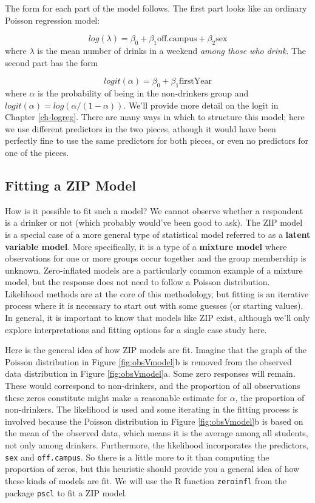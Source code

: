 \documentclass[
]{krantz}
\begin{document}
The form for each part of the model follows. The first part looks like an ordinary Poisson regression model:

\[
log(\lambda)=\beta_0+\beta_1\textrm{off.campus}+ \beta_2\textrm{sex}
\]
where \(\lambda\) is the mean number of drinks in a weekend \emph{among those who drink}.
The second part has the form

\[
logit(\alpha)=\beta_0+\beta_1\textrm{firstYear}
\]
where \(\alpha\) is the probability of being in the non-drinkers group and \(logit(\alpha) = log( \alpha/(1-\alpha))\). We'll provide more detail on the logit in Chapter \ref{ch-logreg}. There are many ways in which to structure this model; here we use different predictors in the two pieces, athough it would have been perfectly fine to use the same predictors for both pieces, or even no predictors for one of the pieces.

\hypertarget{fitting-a-zip-model}{%
\subsection{Fitting a ZIP Model}\label{fitting-a-zip-model}}

How is it possible to fit such a model? We cannot observe whether a respondent is a drinker or not (which probably would've been good to ask). The ZIP model is a special case of a more general type of statistical model referred to as a \textbf{latent variable model}. More specifically, it is a type of a \textbf{mixture model}  where observations for one or more groups occur together and the group membership is unknown. Zero-inflated models are a particularly common example of a mixture model, but the response does not need to follow a Poisson distribution. Likelihood methods are at the core of this methodology, but fitting is an iterative process where it is necessary to start out with some guesses (or starting values). In general, it is important to know that models like ZIP exist, although we'll only explore interpretations and fitting options for a single case study here.

Here is the general idea of how ZIP models are fit. Imagine that the graph of the Poisson distribution in Figure \ref{fig:obsVmodel}b is removed from the observed data distribution in Figure \ref{fig:obsVmodel}a. Some zero responses will remain. These would correspond to non-drinkers, and the proportion of all observations these zeros constitute might make a reasonable estimate for \(\alpha\), the proportion of non-drinkers. The likelihood is used and some iterating in the fitting process is involved because the Poisson distribution in Figure \ref{fig:obsVmodel}b is based on the mean of the observed data, which means it is the average among all students, not only among drinkers. Furthermore, the likelihood incorporates the predictors, \texttt{sex} and \texttt{off.campus}. So there is a little more to it than computing the proportion of zeros, but this heuristic should provide you a general idea of how these kinds of models are fit. We will use the R function \texttt{zeroinfl} from the package \texttt{pscl} to fit a ZIP model.
\end{document}
